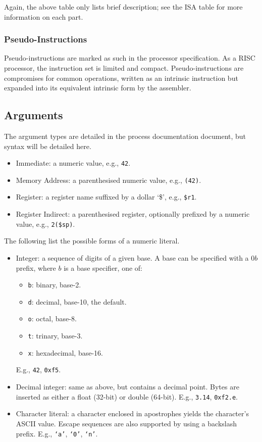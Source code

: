 \documentclass[10pt]{article}
\begin{document}
Again, the above table only lists brief description; see the ISA table for more information on each part.

\subsubsection{Pseudo-Instructions}

Pseudo-instructions are marked as such in the processor specification.
As a RISC processor, the instruction set is limited and compact.
Pseudo-instructions are compromises for common operations, written as an intrinsic instruction but expanded into its equivalent intrinsic form by the assembler.

\subsection{Arguments}\label{subsec:arguments}

The argument types are detailed in the process documentation document, but syntax will be detailed here.
\begin{itemize}
    \item Immediate: a numeric value, e.g., \texttt{42}.
    \item Memory Address: a parenthesised numeric value, e.g., \texttt{(42)}.
    \item Register: a register name suffixed by a dollar `\$', e.g., \texttt{\$r1}.
    \item Register Indirect: a parenthesised register, optionally prefixed by a numeric value, e.g., \texttt{2(\$sp)}.
\end{itemize}

The following list the possible forms of a numeric literal.

\begin{itemize}
    \item Integer: a sequence of digits of a given base.
    A base can be specified with a 0\(b\) prefix, where \(b\) is a base specifier, one of:
    \begin{itemize}
        \item \texttt{b}: binary, base-2.
        \item \texttt{d}: decimal, base-10, the default.
        \item \texttt{o}: octal, base-8.
        \item \texttt{t}: trinary, base-3.
        \item \texttt{x}: hexadecimal, base-16.
    \end{itemize}
    E.g., \texttt{42}, \texttt{0xf5}.
    \item Decimal integer: same as above, but contains a decimal point.
    Bytes are inserted as either a float (32-bit) or double (64-bit).
    E.g., \texttt{3.14}, \texttt{0xf2.e}.
    \item Character literal: a character enclosed in apostrophes yields the character's ASCII value.
    Escape sequences are also supported by using a backslash prefix.
    E.g., \texttt{`a'}, \texttt{`0'}, \texttt{`n'}.
\end{itemize}
\end{document}
